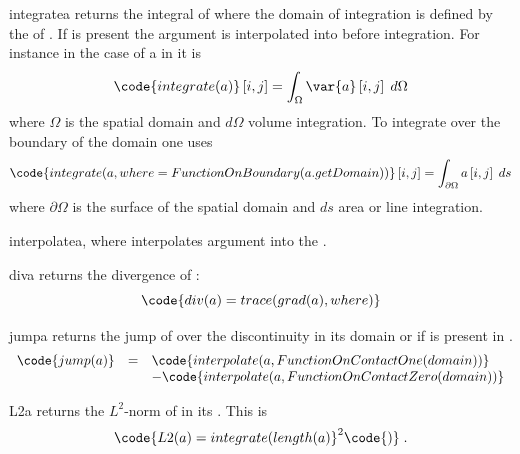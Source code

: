 \begin{funcdesc}{integrate}{a}
returns the integral of  where the domain of integration is defined by
the \FunctionSpace of . If  is present the argument is
interpolated into \FunctionSpace {} before integration.
For instance in the case of a \RankTwo in \ContinuousFunction it is
\begin{equation}
\code{integrate(a)}\left[i,j\right]=\int_{\Omega}\var{a} \left[i,j\right] \; d\Omega
\end{equation}
where $\Omega$ is the spatial domain and $d\Omega$ volume integration.
To integrate over the boundary of the domain one uses
\begin{equation}
\code{integrate(a,where=FunctionOnBoundary(a.getDomain))}\left[i,j\right]=\int_{\partial \Omega} a\left[i,j\right] \; ds
\end{equation}
where $\partial \Omega$ is the surface of the spatial domain and $ds$ area or
line integration.
\end{funcdesc}

\begin{funcdesc}{interpolate}{a, where}
interpolates argument  into the \FunctionSpace {}.
\end{funcdesc}

\begin{funcdesc}{div}{a}
returns the divergence of :
\begin{equation}
    \code{div(a)=trace(grad(a),where)}
\end{equation}
\end{funcdesc}

\begin{funcdesc}{jump}{a}
returns the jump of  over the discontinuity in its domain or if
\Domain {} is present in .
\begin{equation}
\begin{array}{rcl}
\code{jump(a)}& = &\code{interpolate(a,FunctionOnContactOne(domain))} \\
              &   & \hfill - \code{interpolate(a,FunctionOnContactZero(domain))}
\end{array}
\end{equation}
\end{funcdesc}

\begin{funcdesc}{L2}{a}
returns the $L^2$-norm of  in its \FunctionSpace. This is
\begin{equation}
\code{L2(a)=integrate(length(a)}^2\code{)} \; .
\end{equation}
\end{funcdesc}

